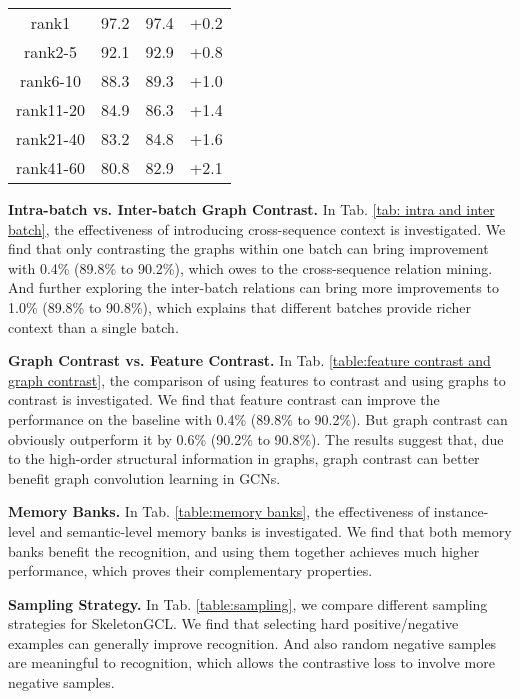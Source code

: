 \documentclass{article} \usepackage{iclr2023_conference,times}
\begin{document}
\begin{minipage}{\textwidth}
\begin{minipage}[t]{0.5\textwidth}
\begin{tabular}{c||c||c||c}
       \hline \hline
        rank1 &	97.2 & 97.4 & +0.2 \\
        rank2-5 & 92.1 & 92.9 & +0.8 \\
        rank6-10 & 88.3 & 89.3 & +1.0 \\
        rank11-20 & 84.9 & 86.3 & +1.4 \\
        rank21-40 & 83.2 & 84.8 & +1.6 \\
        rank41-60 & 80.8 & 82.9 & +2.1 \\
        \hline
    \end{tabular}
    \label{table:rank}
\end{minipage}
\end{minipage}

\noindent \textbf{Intra-batch vs. Inter-batch Graph Contrast.} 
In Tab. \ref{tab: intra and inter batch}, the effectiveness of introducing cross-sequence context is investigated. We find that only contrasting the graphs within one batch can bring improvement with 0.4\% (89.8\% to 90.2\%), which owes to the cross-sequence relation mining. And further exploring the inter-batch relations can bring more improvements to 1.0\% (89.8\% to 90.8\%), which explains that different batches provide richer context than a single batch.

\noindent \textbf{Graph Contrast vs. Feature Contrast.}
In Tab. \ref{table:feature contrast and graph contrast}, the comparison of using features  to contrast and using graphs  to contrast is investigated. We find that feature contrast can improve the performance on the baseline with 0.4\% (89.8\% to 90.2\%). But graph contrast can obviously outperform it by 0.6\% (90.2\% to 90.8\%). The results suggest that, due to the high-order structural information in graphs, graph contrast can better benefit graph convolution learning in GCNs.

\noindent \textbf{Memory Banks.} In Tab. \ref{table:memory banks}, the effectiveness of instance-level and semantic-level memory banks is investigated. We find that both memory banks benefit the recognition, and using them together achieves much higher performance, which proves their complementary properties.

\noindent \textbf{Sampling Strategy.} 
In Tab. \ref{table:sampling}, we compare different sampling strategies for SkeletonGCL. We find that selecting hard positive/negative examples can generally improve recognition. And also random negative samples are meaningful to recognition, which allows the contrastive loss to involve more negative samples.
\end{document}
